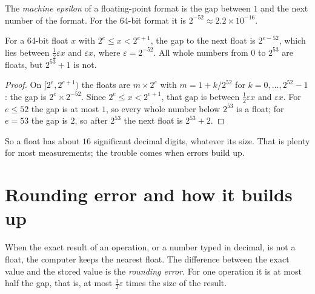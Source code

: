 %
\label{lst:g10:floating-point:gaps}

\label{out:g10:floating-point:gaps}

\begin{definition}\label{def:g10:floating-point:epsilon}
The \emph{machine epsilon} of a floating-point format is the gap between $1$ and the next
number of the format. For the 64-bit format it is $2^{-52} \approx 2.2 \times 10^{-16}$.
\end{definition}

\begin{proposition}\label{prop:g10:floating-point:relative-gap}
For a 64-bit float $x$ with $2^{e} \le x < 2^{e+1}$, the gap to the next float is $2^{e-52}$, which lies between
$\tfrac12 \varepsilon x$ and $\varepsilon x$, where $\varepsilon = 2^{-52}$. All whole numbers from $0$ to $2^{53}$ are
floats, but $2^{53} + 1$ is not.
\end{proposition}

\begin{proof}
On $[2^e, 2^{e+1})$ the floats are $m \times 2^e$ with $m = 1 + k/2^{52}$ for $k = 0, \dots, 2^{52} - 1$: the gap is
$2^{e} \times 2^{-52}$. Since $2^e \le x < 2^{e+1}$, that gap is between $\tfrac12 \varepsilon x$ and $\varepsilon x$.
For $e \le 52$ the gap is at most $1$, so every whole number below $2^{53}$ is a float; for $e = 53$ the gap is $2$,
so after $2^{53}$ the next float is $2^{53} + 2$.
\end{proof}

So a float has about $16$ significant decimal digits, whatever its size. That is plenty for most measurements; the
trouble comes when errors build up.

\section{Rounding error and how it builds up}\label{sec:g10:floating-point:rounding}

\begin{definition}\label{def:g10:floating-point:rounding-error}
When the exact result of an operation, or a number typed in decimal, is not a float, the computer keeps the nearest
float. The difference between the exact value and the stored value is the \emph{rounding
error}. For one operation it is at most half the gap, that is, at most $\tfrac12\varepsilon$
times the size of the result.
\end{definition}

